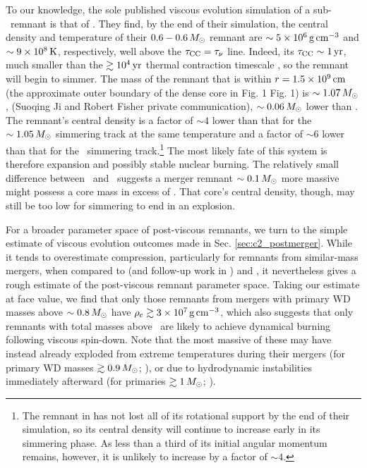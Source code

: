 To our knowledge, the sole published viscous evolution simulation of a sub-\Mch\ remnant is that of \cite{ji+13}.  They find, by the end of their simulation, the central density and temperature of their $0.6 - 0.6\,\Msun$ remnant are $\sim5\times10^6\,\gcc$ and $\sim9\times10^8\,\mathrm{K}$, respectively, well above the $\taucc = \taunu$ line.  Indeed, its $\taucc \sim 1\,\mrm{yr}$, much smaller than the $\gtrsim 10^4\,\mathrm{yr}$ thermal contraction timescale \citep{shen+12}, so the remnant will begin to simmer.  The mass of the remnant that is within $r = 1.5\times10^9\,\mathrm{cm}$ (the approximate outer boundary of the dense core in Fig. 1 \citealt{ji+13} Fig. 1) is $\sim1.07\,\Msun$, (Suoqing Ji and Robert Fisher private communication), $\sim0.06\,\Msun$ lower than \Mcrit.  The remnant's central density is a factor of $\sim4$ lower than that for the $\sim1.05\,\Msun$ simmering track at the same temperature and a factor of $\sim6$ lower than that for the \Mcrit\ simmering track.\footnote{The remnant in \citep{ji+13} has not lost all of its rotational support by the end of their simulation, so its central density will continue to increase early in its simmering phase.  As less than a third of its initial angular momentum remains, however, it is unlikely to increase by a factor of $\sim4$.}  The most likely fate of this system is therefore expansion and possibly stable nuclear burning.  The relatively small difference between \Mc\ and \Mcrit\ suggests a merger remnant $\sim0.1\,\Msun$ more massive might possess a core mass in excess of \Mcrit.  That core's central density, though, may still be too low for simmering to end in an explosion.



For a broader parameter space of post-viscous remnants, we turn to the simple estimate of viscous evolution outcomes made in Sec. \ref{sec:c2_postmerger}.  While it tends to overestimate compression, particularly for remnants from similar-mass mergers, when compared to \citeauthor{schw+12} (and follow-up work in \citealt{rask+14}) and \cite{ji+13}, it nevertheless gives a rough estimate of the post-viscous remnant parameter space.  Taking our estimate at face value, we find that only those remnants from mergers with primary WD masses above $\sim0.8\,\Msun$ have $\rhoc \gtrsim 3\times10^7\,\gcc$, which also suggests that only remnants with total masses above \Mch\ are likely to achieve dynamical burning following viscous spin-down.  Note that the most massive of these may have instead already exploded from extreme temperatures during their mergers (for primary WD masses $\gtrsim0.9\,\Msun$; \citealt{pakm+10,pakm+11}), or due to hydrodynamic instabilities immediately afterward (for primaries $\gtrsim1\,\Msun$; \citealt{kash+15}).

